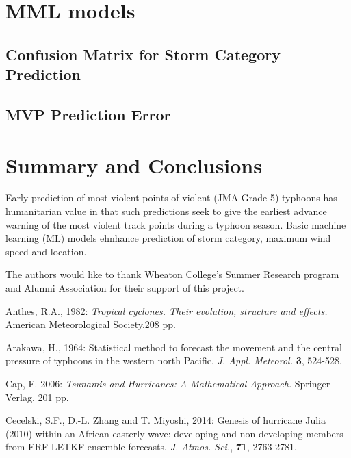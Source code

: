 \documentclass[a4paper, 12pt]{article}
\begin{document}
{\section{MML models}

\subsection{Confusion Matrix for Storm Category Prediction}

\subsection{MVP Prediction Error}

\section{Summary and Conclusions}

Early prediction of most violent points of violent (JMA Grade 5) typhoons has humanitarian value in that such predictions seek to give the earliest advance warning of the most violent track points during a typhoon season. Basic machine learning (ML) models ehnhance prediction of storm category, maximum wind speed and location.
  

\newpage




 The authors would like to thank Wheaton College's Summer Research  program and Alumni Association for their support of this project.



\begin{list}{}{\leftmargin=1em \itemindent=-2em}


\item Anthes, R.A., 1982: \emph{Tropical cyclones. Their evolution, structure and effects.} American Meteorological Society.208 pp.

\item  Arakawa, H., 1964: Statistical method to forecast the movement and the central pressure of typhoons in the western north Pacific.  \emph{J. Appl. Meteorol.} {\bf 3}, 524-528.


\item Cap, F. 2006: {\em Tsunamis and Hurricanes: A Mathematical Approach.} Springer-Verlag, 201 pp.

\item Cecelski, S.F., D.-L. Zhang and T. Miyoshi, 2014: Genesis of hurricane Julia (2010) within an African easterly wave: developing and non-developing members from ERF-LETKF ensemble forecasts. \emph{J. Atmos. Sci.}, {\bf 71}, 2763-2781.


\end{list}}
\end{document}
